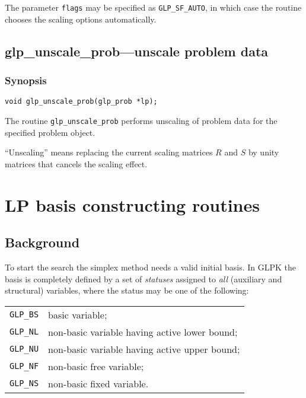 The parameter \verb|flags| may be specified as \verb|GLP_SF_AUTO|, in
which case the routine chooses the scaling options automatically.

\subsection{glp\_unscale\_prob---unscale problem data}

\subsubsection*{Synopsis}

\begin{verbatim}
void glp_unscale_prob(glp_prob *lp);
\end{verbatim}

The routine \verb|glp_unscale_prob| performs unscaling of problem data
for the specified problem object.

``Unscaling'' means replacing the current scaling matrices $R$ and $S$
by unity matrices that cancels the scaling effect.


\newpage

\section{LP basis constructing routines}

\subsection{Background}

To start the search the simplex method needs a valid initial basis. In
GLPK the basis is completely defined by a set of {\it statuses} assigned
to {\it all} (auxiliary and structural) variables, where the status may
be one of the following:

\begin{tabular}{@{}ll}
\verb|GLP_BS| & basic variable;\\
\verb|GLP_NL| & non-basic variable having active lower bound;\\
\verb|GLP_NU| & non-basic variable having active upper bound;\\
\verb|GLP_NF| & non-basic free variable;\\
\verb|GLP_NS| & non-basic fixed variable.\\
\end{tabular}

